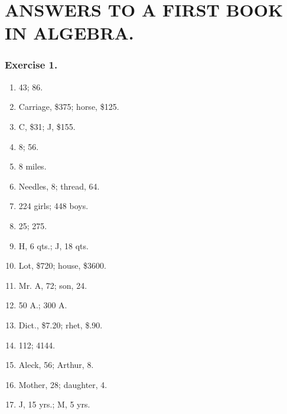 \documentclass{book}
\begin{document}
\chapter*{ANSWERS TO A FIRST BOOK IN ALGEBRA.}


\subsection*{Exercise 1.}

\begin{enumerate} \item 43; 86.

\item Carriage, \$375; horse, \$125.

\item C, \$31; J, \$155.

\item 8; 56.

\item 8 miles.

\item Needles, 8; thread, 64.

\item 224 girls; 448 boys.

\item 25; 275.

\item H, 6 qts.; J, 18 qts.

\item Lot, \$720; house, \$3600.

\item Mr. A, 72; son, 24.

\item 50 A.; 300 A.

\item Dict., \$7.20; rhet, \$.90.

\item 112; 4144.

\item Aleck, 56; Arthur, 8.

\item Mother, 28; daughter, 4.

\item J, 15 yrs.; M, 5 yrs.

\end{enumerate}
\end{document}
